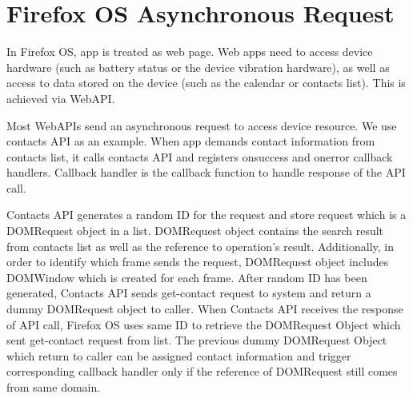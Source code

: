 \documentclass[12pt]{article}
\begin{document}
\section*{Firefox OS Asynchronous Request}
In Firefox OS, app is treated as web page. Web apps need to access device hardware (such as battery status or the device vibration hardware), as well as access to data stored on the device (such as the calendar or contacts list). This is achieved via WebAPI. %

Most WebAPIs send an asynchronous request to access device resource. We use contacts API as an example. When app demands contact information from contacts list,  it calls contacts API and registers onsuccess and onerror callback handlers. Callback handler is the callback function to handle response of the API call. %

Contacts API generates a random ID for the request and store request which is a DOMRequest object in a list. DOMRequest object contains the search result from contacts list as well as the reference to operation's result. Additionally, in order to identify which frame sends the request, DOMRequest object includes DOMWindow which is created for each frame. After random ID has been generated, Contacts API sends get-contact request to system and return a dummy DOMRequest object to caller.   %
When Contacts API receives the response of API call, Firefox OS uses same ID to retrieve the DOMRequest Object which sent get-contact request from list. The previous dummy DOMRequest Object which return to caller can be assigned contact information and trigger corresponding callback handler only if the reference of DOMRequest still comes from same domain.   %
\end{document}
